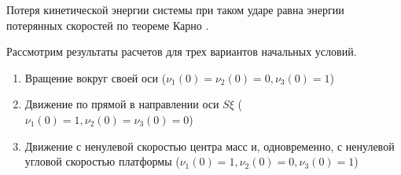 Потеря кинетической энергии системы при таком ударе равна энергии потерянных скоростей по теореме Карно \cite{Vilke}.





Рассмотрим результаты расчетов для трех вариантов начальных условий.
\begin{enumerate}[wide]
    \item \label{sol:self_rot} Вращение вокруг своей оси ($\nu_1(0) = \nu_2(0) = 0, \nu_3(0) = 1$)
    \item \label{sol:straight} Движение по прямой в направлении оси $S\xi$ ($\nu_1(0) = 1, \nu_2(0) = \nu_3(0) = 0$)
    \item \label{sol:wrench} Движение с ненулевой скоростью центра масс и, одновременно, с ненулевой угловой скоростью платформы ($\nu_1(0) = 1, \nu_2(0) = 0, \nu_3(0) = 1$)
\end{enumerate}

